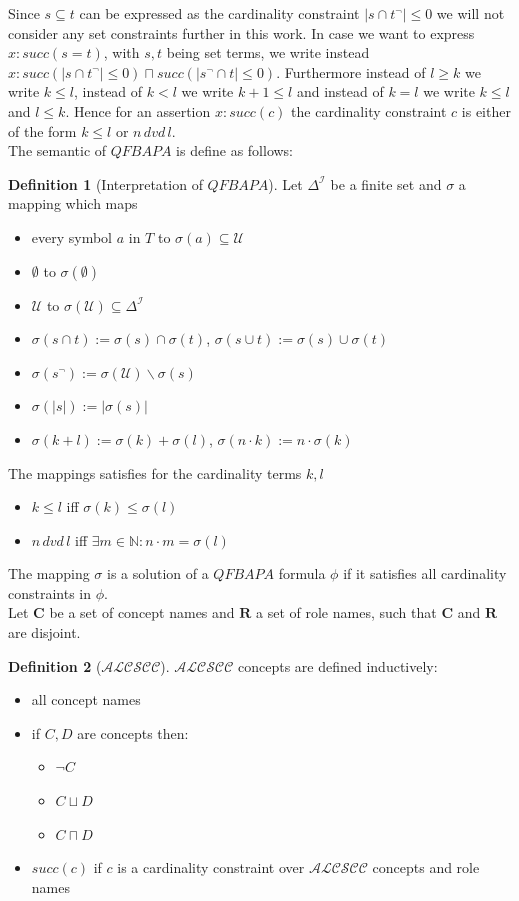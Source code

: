 \documentclass{book}
\theoremstyle{break}
\theoremstyle{definition}
\newtheorem{mydef}{Definition}
\begin{document}
Since $s\subseteq t$ can be expressed as the cardinality constraint $|s\cap t^\neg|\leq 0$ we will not consider any set constraints further in this work. In case we want to express $x:succ(s=t)$, with $s,t$ being set terms, we write instead $x:succ(|s\cap t^\neg|\leq 0)\sqcap succ(|s^\neg\cap t|\leq 0)$. Furthermore instead of $l\geq k$ we write $k\leq l$, instead of $k<l$ we write $k+1\leq l$ and instead of $k=l$ we write $k\leq l$ and $l\leq k$. Hence for an assertion $x:succ(c)$ the cardinality constraint $c$ is either of the form $k\leq l$ or $n\,dvd\,l$.\\
The semantic of $QFBAPA$ is define as follows:
\begin{mydef}[Interpretation of $QFBAPA$]
Let $\Delta^\mathcal{I}$ be a finite set and $\sigma$ a mapping which maps
\begin{itemize}
\item every symbol $a$ in $T$ to $\sigma(a)\subseteq\mathcal{U}$
\item $\emptyset$ to $\sigma(\emptyset)$
\item $\mathcal{U}$ to $\sigma(\mathcal{U})\subseteq \Delta^\mathcal{I}$
\item $\sigma(s\cap t):= \sigma(s)\cap \sigma(t)$, $\sigma(s\cup t):= \sigma(s)\cup \sigma(t)$
\item $\sigma(s^\neg):=\sigma(\mathcal{U})\backslash \sigma(s)$
\item $\sigma(|s|):=|\sigma(s)|$
\item $\sigma(k+l):=\sigma(k)+\sigma(l)$, $\sigma(n\cdot k):= n\cdot \sigma(k)$
\end{itemize}
The mappings satisfies for the cardinality terms $k,l$
\begin{itemize}
\item $k\leq l$ iff $\sigma(k)\leq \sigma(l)$
\item $n\,dvd\,l$ iff $\exists m\in\mathbb{N}:n\cdot m = \sigma(l)$
\end{itemize}
\end{mydef}
The mapping $\sigma$ is a solution of a $QFBAPA$ formula $\phi$ if it satisfies all cardinality constraints in $\phi$.\\
Let $\mathbf{C}$ be a set of concept names and $\mathbf{R}$ a set of role names, such that $\mathbf{C}$ and $\mathbf{R}$ are disjoint.
\begin{mydef}[$\mathcal{ALCSCC}$]
$\mathcal{ALCSCC}$ concepts are defined inductively:
\begin{itemize}
\item all concept names
\item if $C,D$ are concepts then:
\begin{itemize}
\item $\neg C$
\item $C\sqcup D$
\item $C\sqcap D$
\end{itemize}
\item $succ(c)$ if $c$ is a cardinality constraint over $\mathcal{ALCSCC}$ concepts and role names
\end{itemize}
\end{mydef}
\end{document}
